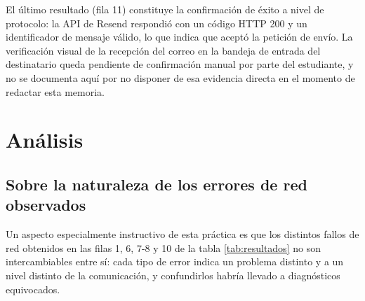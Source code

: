 \documentclass[12pt,a4paper]{article}
\begin{document}
El último resultado (fila 11) constituye la confirmación de éxito a nivel de protocolo: la API de Resend respondió con un código HTTP 200 y un identificador de mensaje válido, lo que indica que aceptó la petición de envío. La verificación visual de la recepción del correo en la bandeja de entrada del destinatario queda pendiente de confirmación manual por parte del estudiante, y no se documenta aquí por no disponer de esa evidencia directa en el momento de redactar esta memoria.



\section{Análisis}

\subsection{Sobre la naturaleza de los errores de red observados}

Un aspecto especialmente instructivo de esta práctica es que los distintos fallos de red obtenidos en las filas 1, 6, 7-8 y 10 de la tabla \ref{tab:resultados} no son intercambiables entre sí: cada tipo de error indica un problema distinto y a un nivel distinto de la comunicación, y confundirlos habría llevado a diagnósticos equivocados.
\end{document}
